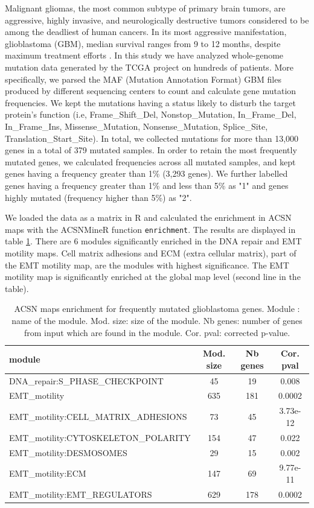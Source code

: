 \documentclass{article}
\begin{document}
Malignant gliomas, the most common subtype of primary brain tumors, are
aggressive, highly invasive, and neurologically destructive tumors considered
to be among the deadliest of human cancers. In its most aggressive
manifestation, glioblastoma (GBM), median survival ranges from 9 to 12 months,
despite maximum treatment efforts \cite{maher2001malignant}. In this study we
have analyzed whole-genome mutation data generated by the TCGA project on
hundreds of patients. More specifically, we parsed the MAF (Mutation Annotation
Format) GBM files produced by different sequencing centers to count and
calculate gene mutation frequencies. We kept the mutations having a status
likely to disturb the target protein's function (i.e, Frame\_Shift\_Del,
Nonstop\_Mutation, In\_Frame\_Del, In\_Frame\_Ins, Missense\_Mutation,
Nonsense\_Mutation, Splice\_Site, Translation\_Start\_Site). In total, we
collected mutations for more than 13,000 genes in a total of 379 mutated
samples. In order to retain the most frequently mutated genes, we calculated
frequencies across all mutated samples, and kept genes having a frequency
greater than 1\% (3,293 genes). We further labelled genes having a frequency
greater than 1\% and less than 5\% as "1" and genes highly mutated (frequency
higher than 5\%) as "2". 

We loaded the data as a matrix in R and calculated the enrichment in ACSN maps
with the ACSNMineR function \verb|enrichment|. The results are displayed in
table \ref{tab:table_gbm}. There are 6 modules significantly enriched in the
DNA repair and EMT motility maps. Cell matrix adhesions and ECM
(extra cellular matrix), part of the EMT motility map, are the modules with
highest significance. The EMT motility map is significantly enriched at the
global map level (second line in the table). 

\begin{table}[h!]
  \centering
  \caption{ACSN maps enrichment for frequently mutated glioblastoma genes.
  Module : name of the module. Mod. size: size of the module. Nb genes: number
  of genes from input which are found in the module. Cor. pval: corrected
  p-value.} 
  \label{tab:table_gbm}

\begin{tabular}{l c c c}
\hline
module & Mod. size & Nb genes & Cor. pval\\ 
\hline
DNA\_repair:S\_PHASE\_CHECKPOINT &   45 &      19 &     0.008\\
EMT\_motility  &  635  &   181  &   0.0002\\
EMT\_motility:CELL\_MATRIX\_ADHESIONS   &   73  &    45  &    3.73e-12\\
EMT\_motility:CYTOSKELETON\_POLARITY   &   154 &    47  &    0.022\\
EMT\_motility:DESMOSOMES & 29  &    15  &    0.002\\
EMT\_motility:ECM    &    147  &   69   &   9.77e-11\\
EMT\_motility:EMT\_REGULATORS  &   629   &  178  &   0.0002\\
\hline
\end{tabular}
\end{table}
\end{document}
